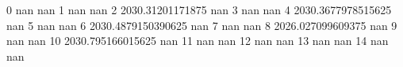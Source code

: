 0 nan nan
1 nan nan
2 2030.31201171875 nan
3 nan nan
4 2030.3677978515625 nan
5 nan nan
6 2030.4879150390625 nan
7 nan nan
8 2026.027099609375 nan
9 nan nan
10 2030.795166015625 nan
11 nan nan
12 nan nan
13 nan nan
14 nan nan
